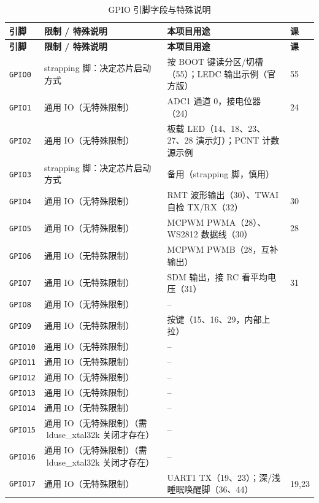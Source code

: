 \documentclass[UTF8,a4paper,11pt,fontset=fandol]{ctexart}
\newcommand{\fld}[1]{\texttt{#1}}
\newcommand{\tblhead}[1]{\textbf{#1}}
\begin{document}
\begin{center}\footnotesize
\begin{longtable}{@{}p{1.4cm}>{\raggedright\arraybackslash}p{5.2cm}>{\raggedright\arraybackslash}p{5.2cm}p{1.4cm}@{}}
\caption{GPIO 引脚字段与特殊说明}\label{tab:gpio}\\
\toprule
\tblhead{引脚} & \tblhead{限制 / 特殊说明} & \tblhead{本项目用途} & \tblhead{课} \\
\midrule
\endfirsthead
\toprule
\tblhead{引脚} & \tblhead{限制 / 特殊说明} & \tblhead{本项目用途} & \tblhead{课} \\
\midrule
\endhead
\bottomrule
\endlastfoot
\fld{GPIO0} & strapping 脚：决定芯片启动方式 & 按 BOOT 键读分区/切槽（55）；LEDC 输出示例（官方版） & 55 \\
\fld{GPIO1} & 通用 IO（无特殊限制） & ADC1 通道 0，接电位器（24） & 24 \\
\fld{GPIO2} & 通用 IO（无特殊限制） & 板载 LED（14、18、23、27、28 演示灯）；PCNT 计数源示例 &  \\
\fld{GPIO3} & strapping 脚：决定芯片启动方式 & 备用（strapping 脚，慎用） &  \\
\fld{GPIO4} & 通用 IO（无特殊限制） & RMT 波形输出（30）、TWAI 自检 TX/RX（32） & 30 \\
\fld{GPIO5} & 通用 IO（无特殊限制） & MCPWM PWMA（28）、WS2812 数据线（30） & 28 \\
\fld{GPIO6} & 通用 IO（无特殊限制） & MCPWM PWMB（28，互补输出） &  \\
\fld{GPIO7} & 通用 IO（无特殊限制） & SDM 输出，接 RC 看平均电压（31） & 31 \\
\fld{GPIO8} & 通用 IO（无特殊限制） & -- &  \\
\fld{GPIO9} & 通用 IO（无特殊限制） & 按键（15、16、29，内部上拉） &  \\
\fld{GPIO10} & 通用 IO（无特殊限制） & -- &  \\
\fld{GPIO11} & 通用 IO（无特殊限制） & -- &  \\
\fld{GPIO12} & 通用 IO（无特殊限制） & -- &  \\
\fld{GPIO13} & 通用 IO（无特殊限制） & -- &  \\
\fld{GPIO14} & 通用 IO（无特殊限制） & -- &  \\
\fld{GPIO15} & 通用 IO（无特殊限制）（需 ld{use\_xtal32k} 关闭才存在） & -- &  \\
\fld{GPIO16} & 通用 IO（无特殊限制）（需 ld{use\_xtal32k} 关闭才存在） & -- &  \\
\fld{GPIO17} & 通用 IO（无特殊限制） & UART1 TX（19、23）；深/浅睡眠唤醒脚（36、44） & 19,23 \\

\end{longtable}
\end{center}
\end{document}
